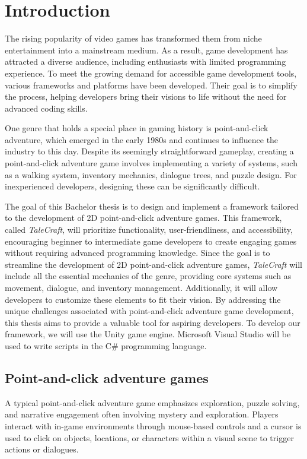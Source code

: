 \chapter{Introduction}
\label{Intro}

The rising popularity of video games has transformed them from niche entertainment into a mainstream medium. As a result, game development has attracted a diverse audience, including enthusiasts with limited programming experience. To meet the growing demand for accessible game development tools, various frameworks and platforms have been developed. Their goal is to simplify the process, helping developers bring their visions to life without the need for advanced coding skills.

One genre that holds a special place in gaming history is point-and-click adventure, which emerged in the early 1980s and continues to influence the industry to this day. Despite its seemingly straightforward gameplay, creating a point-and-click adventure game involves implementing a variety of systems, such as a walking system, inventory mechanics, dialogue trees, and puzzle design. For inexperienced developers, designing these can be significantly difficult.

The goal of this Bachelor thesis is to design and implement a framework tailored to the development of 2D point-and-click adventure games. This framework, called \textit{TaleCraft}, will prioritize functionality, user-friendliness, and accessibility, encouraging beginner to intermediate game developers to create engaging games without requiring advanced programming knowledge. Since the goal is to streamline the development of 2D point-and-click adventure games, \textit{TaleCraft} will include all the essential mechanics of the genre, providing core systems such as movement, dialogue, and inventory management. Additionally, it will allow developers to customize these elements to fit their vision. By addressing the unique challenges associated with point-and-click adventure game development, this thesis aims to provide a valuable tool for aspiring developers. To develop our framework, we will use the Unity game engine. Microsoft Visual Studio will be used to write scripts in the C\# programming language. 

\section{Point-and-click adventure games}
A typical point-and-click adventure game emphasizes exploration, puzzle solving, and narrative engagement often involving mystery and exploration. Players interact with in-game environments through mouse-based controls and a cursor is used to click on objects, locations, or characters within a visual scene to trigger actions or dialogues. 

